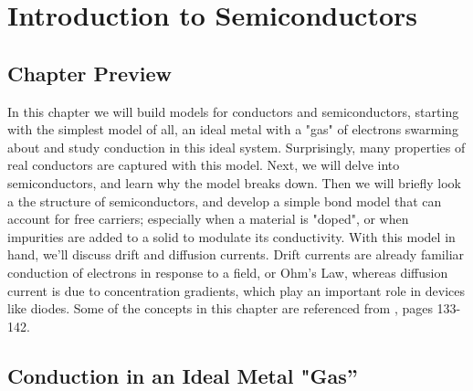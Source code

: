 \chapter{Introduction to Semiconductors}
\label{ch:ch03_semi}
\graphicspath{{./figs_semi/}}
\section{Chapter Preview}
In this chapter we will build models for conductors and semiconductors, starting with the simplest model of all, an ideal metal with a "gas" of electrons swarming about and study conduction in this ideal system.  Surprisingly, many properties of real conductors are captured with this model.  Next, we will delve into semiconductors, and learn why the model breaks down.  Then we will briefly look a the structure of semiconductors, and  develop a simple bond model that can account for free carriers; especially when a material is "doped", or when impurities are added to a solid to modulate its conductivity.  With this model in hand, we'll discuss drift and diffusion currents.  Drift currents are already familiar conduction of electrons in response to a field, or Ohm's Law, whereas diffusion current is due to concentration gradients, which play an important role in devices like diodes.  Some of the concepts in this chapter are referenced from \cite{purcell}, pages 133-142.
\newpage
\section{Conduction in an Ideal Metal "Gas''}
